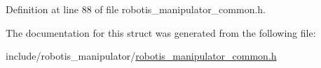 Definition at line 88 of file robotis\+\_\+manipulator\+\_\+common.\+h.



The documentation for this struct was generated from the following file\+:\begin{DoxyCompactItemize}
\item 
include/robotis\+\_\+manipulator/\hyperlink{robotis__manipulator__common_8h}{robotis\+\_\+manipulator\+\_\+common.\+h}\end{DoxyCompactItemize}
